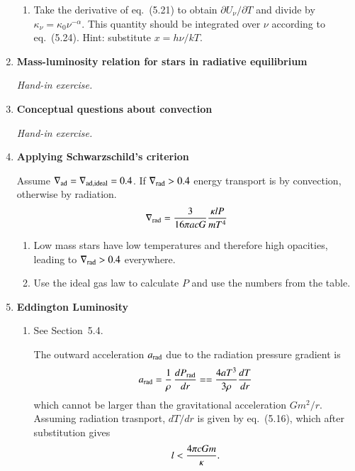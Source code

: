 \documentclass[11pt,a4paper]{report}
\begin{document}
\begin{enumerate}
\begin{enumerate}
  \item Take the derivative of eq.~(5.21) to obtain $\partial
    U_\nu/\partial T$ and divide by $\kappa_\nu = \kappa_0
    \nu^{-\alpha}$. This quantity should be integrated over $\nu$
    according to eq.~(5.24). Hint: substitute $x = h\nu/kT$.

  \end{enumerate}

\item {\bf Mass-luminosity relation for stars in radiative equilibrium}

  \emph{Hand-in exercise.}


\item {\bf Conceptual questions about convection} 

  \emph{Hand-in exercise.}


\item {\bf Applying Schwarzschild's criterion} 

  Assume $\nabla_{\rm ad} =\nabla_{\rm ad,ideal}= 0.4$. If
  $\nabla_{\rm rad} > 0.4$ energy transport is by convection,
  otherwise by radiation.
  \[
  \nabla_{\rm rad} = \frac{3}{16 \pi a c G} \frac{\kappa l P}{m
    T^4}
  \]

  \begin{enumerate}
  \item Low mass stars have low temperatures and therefore high
    opacities, leading to $\nabla_{\rm rad} > 0.4$ everywhere.
  \item Use the ideal gas law to calculate $P$ and use the numbers
    from the table.
  \end{enumerate}



\item{\bf Eddington Luminosity}

\begin{enumerate}

  \item 
    See Section~5.4.
    
    The outward acceleration $a_{\rm rad}$ due to the radiation
    pressure gradient is
    \[
    a_{\rm rad} = \frac{1}{\rho}\,\frac{dP_{\rm rad}}{dr} = =
    \frac{4aT^3}{3\rho}\frac{dT}{dr}
    \]
    which cannot be larger than the gravitational acceleration
    $Gm^2/r$. Assuming radiation trasnport, $dT/dr$ is given by eq.~(5.16),
    which after substitution gives 
    \[
    l < \frac{4 \pi c G m}{\kappa}.
    \]


\end{enumerate}
\end{enumerate}
\end{document}
